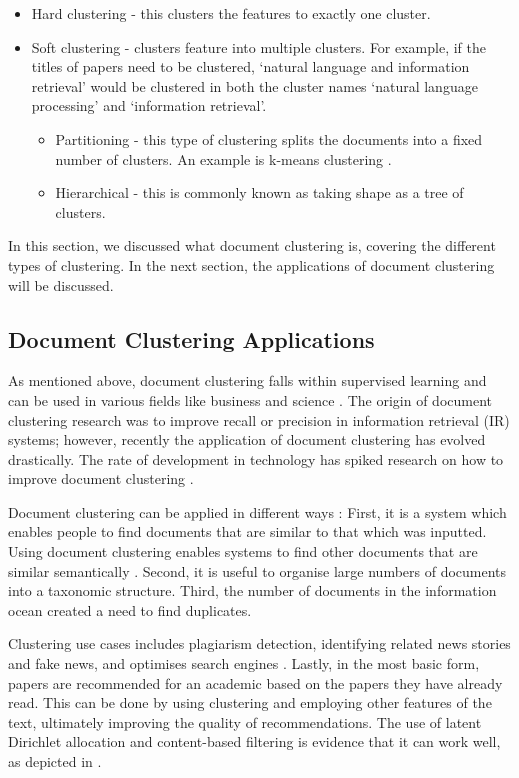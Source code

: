 \begin{itemize}
\item Hard clustering - this clusters the features to exactly one cluster.
\item Soft clustering - clusters feature into multiple clusters. For example, if the titles of papers need to be clustered, ‘natural language and information retrieval’ would be clustered in both the cluster names ‘natural language processing’ and ‘information retrieval’.
\begin{itemize}
    \item Partitioning - this type of clustering splits the documents into a fixed number of clusters. An example is k-means clustering \cite{chen2010integration}.
    \item Hierarchical - this is commonly known as taking shape as a tree of clusters.
  \end{itemize}
\end{itemize}

In this section, we discussed what document clustering is, covering the different types of clustering. In the next section, the applications of document clustering will be discussed.

\subsection{Document Clustering Applications}

As mentioned above, document clustering falls within supervised learning and can be used in various fields like business and science \cite{jain2010data}. The origin of document clustering research was to improve recall or precision in information retrieval (IR) systems; however, recently the application of document clustering has evolved drastically. The rate of development in technology has spiked research on how to improve document clustering \cite{alhawarat2018revisiting,mekonnen2017topic}. 

Document clustering can be applied in different ways \cite{abualigah2017text}: First, it is a system which enables people to find documents that are similar to that which was inputted. Using document clustering enables systems to find other documents that are similar semantically \cite{shah2012document}. Second, it is useful to organise large numbers of documents into a taxonomic structure. Third, the number of documents in the information ocean created a need to find duplicates. 

Clustering use cases includes plagiarism detection, identifying related news stories and fake news, and optimises search engines \cite{jin2016news}. Lastly, in the most basic form, papers are recommended for an academic based on the papers they have already read. This can be done by using clustering and employing other features of the text, ultimately improving the quality of recommendations. The use of latent Dirichlet allocation and content-based filtering is evidence that it can work well, as depicted in .

